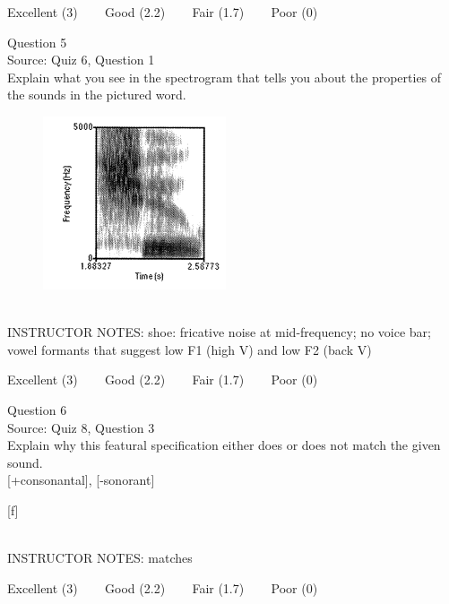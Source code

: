 \documentclass[12pt]{article}
\begin{document}
\vfill
Excellent (3) ~~~ Good (2.2) ~~~ Fair (1.7) ~~~ Poor (0)
\newpage

{\large Question 5}\\

Source: Quiz 6, Question 1\\

Explain what you see in the spectrogram that tells you about the properties of the sounds in the pictured word.\\

\begin{figure}[H]
\includegraphics{../images/spectrogram_shoe.png}
\end{figure}

~\\
INSTRUCTOR NOTES: shoe: fricative noise at mid-frequency; no voice bar; vowel formants that suggest low F1 (high V) and low F2 (back V)


\vfill
Excellent (3) ~~~ Good (2.2) ~~~ Fair (1.7) ~~~ Poor (0)
\newpage

{\large Question 6}\\

Source: Quiz 8, Question 3\\

Explain why this featural specification either does or does not match the given sound.\\

{[+consonantal]}, {[-sonorant]}

{[f]}


~\\
INSTRUCTOR NOTES: matches


\vfill
Excellent (3) ~~~ Good (2.2) ~~~ Fair (1.7) ~~~ Poor (0)
\newpage

\begin{center}
\textbf{{\color{red}{\HUGE END OF EXAM}}}\\

\end{center}
\newpage
\end{document}
